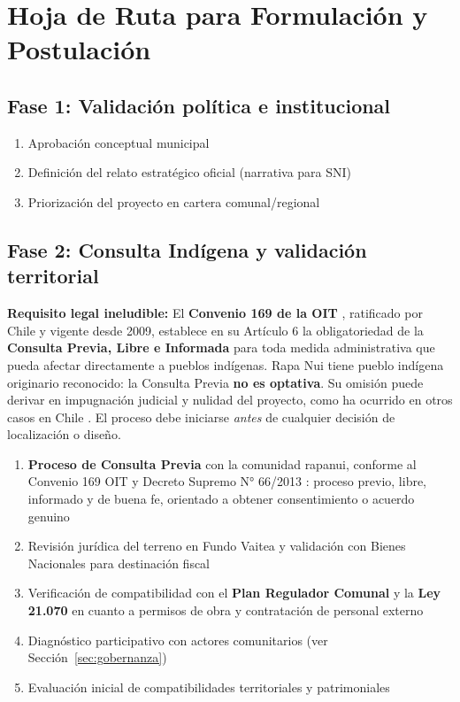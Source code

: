\documentclass[12pt, a4paper]{article}
\begin{document}
\section{Hoja de Ruta para Formulación y Postulación}

\subsection{Fase 1: Validación política e institucional}

\begin{enumerate}[leftmargin=*, itemsep=3pt]
  \item Aprobación conceptual municipal
  \item Definición del relato estratégico oficial (narrativa para SNI)
  \item Priorización del proyecto en cartera comunal/regional
\end{enumerate}

\subsection{Fase 2: Consulta Indígena y validación territorial}

\begin{conceptoclave}
  \textbf{Requisito legal ineludible:} El \textbf{Convenio 169 de la OIT}
  \citep{Convenio169}, ratificado por Chile y vigente desde 2009, establece en su
  Artículo 6 la obligatoriedad de la \textbf{Consulta Previa, Libre e Informada}
  para toda medida administrativa que pueda afectar directamente a pueblos indígenas.
  Rapa Nui tiene pueblo indígena originario reconocido: la Consulta Previa
  \textbf{no es optativa}. Su omisión puede derivar en impugnación judicial y
  nulidad del proyecto, como ha ocurrido en otros casos en Chile
  \citep{DS66Consulta}. El proceso debe iniciarse \textit{antes} de cualquier
  decisión de localización o diseño.
\end{conceptoclave}

\begin{enumerate}[leftmargin=*, itemsep=3pt]
  \item \textbf{Proceso de Consulta Previa} con la comunidad rapanui, conforme al
        Convenio 169 OIT y Decreto Supremo N° 66/2013 \citep{DS66Consulta}:
        proceso previo, libre, informado y de buena fe, orientado a obtener
        consentimiento o acuerdo genuino
  \item Revisión jurídica del terreno en Fundo Vaitea y validación con Bienes
        Nacionales para destinación fiscal \citep{BienesNacionalesVaitea2024}
  \item Verificación de compatibilidad con el \textbf{Plan Regulador Comunal}
        y la \textbf{Ley 21.070} \citep{Ley21070} en cuanto a permisos de obra
        y contratación de personal externo
  \item Diagnóstico participativo con actores comunitarios (ver Sección~\ref{sec:gobernanza})
  \item Evaluación inicial de compatibilidades territoriales y patrimoniales
\end{enumerate}
\end{document}
